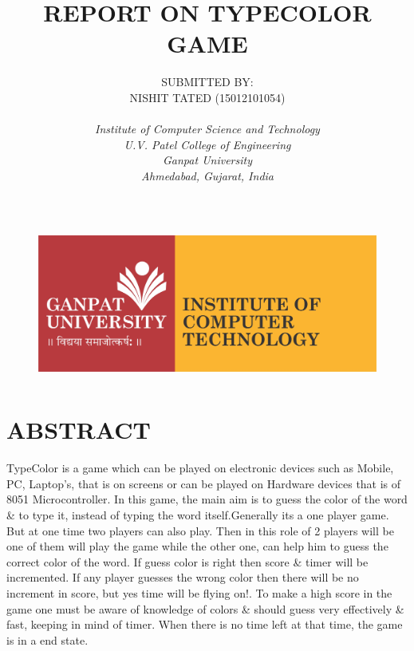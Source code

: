 \documentclass[12pt]{article}
\title{ REPORT ON TYPECOLOR GAME }
\author{
		SUBMITTED BY:\\
		NISHIT TATED   (15012101054)\\\\
		\textit{Institute of Computer Science and Technology}\\
		\textit{U.V. Patel College of Engineering}\\
		\textit{Ganpat University}\\
		\textit{Ahmedabad, Gujarat, India}
	}
\begin{document}
	\maketitle

	\begin{figure}
		\centering
		\includegraphics[height=5cm] {GNUICT_Logo.jpg}		
	\end{figure}
	\pagebreak
\tableofcontents
\pagebreak

	\pagebreak
	
	\section{ABSTRACT}
	
	TypeColor is a game which can be played on electronic devices such as Mobile, PC, Laptop's, that is on screens or can be played on Hardware devices that is of 8051 Microcontroller. In this game, the main aim is to guess the color of the word \& to type it, instead of typing the word itself.Generally its a one player game. But at one time two players can also play. Then in this role of 2 players will be one of them will play the game while the other one, can help him to guess the correct color of the word. If guess color is right then score \& timer will be incremented. If any player guesses the wrong color then there will be no increment in score, but yes time will be flying on!. To make a high score in the game one must be aware of knowledge of colors \& should guess very effectively \& fast, keeping in mind of timer. When there is no time left at that time, the game is in a end state.
	
	
\end{document}
